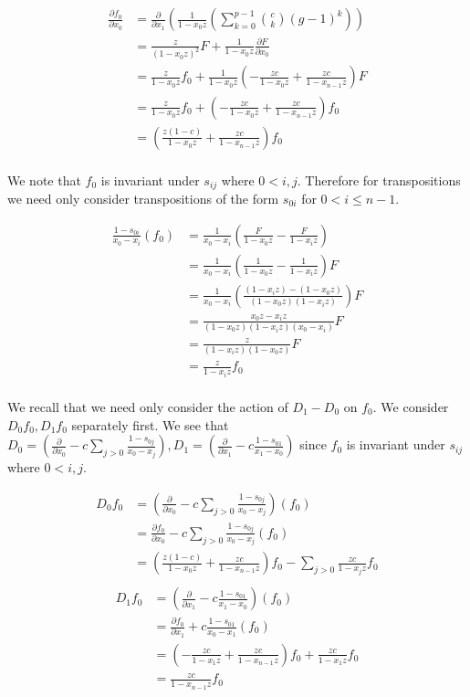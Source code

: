 \documentclass{article}
\numberwithin{equation}{section}
\begin{document}
\begin{align*}
\frac{\partial f_0}{\partial x_0}&=\frac{\partial}{\partial x_1}\left(\frac{1}{1-x_0z}\left(\sum_{k=0}^{p-1} \binom{c}{k} (g-1)^k\right)\right)\\
&=\frac{z}{(1-x_0z)^2}F+\frac{1}{1-x_0z}\frac{\partial F}{\partial x_0}\\
&=\frac{z}{1-x_0z}f_0+\frac{1}{1-x_0z}\left(-\frac{zc}{1-x_0z}+\frac{zc}{1-x_{n-1}z}\right)F\\
&=\frac{z}{1-x_0z}f_0+\left(-\frac{zc}{1-x_0z}+\frac{zc}{1-x_{n-1}z}\right)f_0\\
&=\left(\frac{z(1-c)}{1-x_0z}+\frac{zc}{1-x_{n-1}z}\right)f_0\\
\end{align*}

We note that $f_0$ is invariant under $s_{ij}$ where $0 < i,j$. Therefore for transpositions we need only consider transpositions of the form $s_{0i}$ for $0 < i \le n-1$. 

\begin{align*}
\frac{1-s_{0i}}{x_0-x_i}(f_0)&=\frac{1}{x_0-x_i}\left(\frac{F}{1-x_0z}-\frac{F}{1-x_iz}\right)\\
&=\frac{1}{x_0-x_i}\left(\frac{1}{1-x_0z}-\frac{1}{1-x_iz}\right)F\\
&=\frac{1}{x_0-x_i}\left(\frac{(1-x_iz)-(1-x_0z)}{(1-x_0z)(1-x_iz)}\right)F\\
&=\frac{x_0z-x_iz}{(1-x_0z)(1-x_iz)(x_0-x_i)}F\\
&=\frac{z}{(1-x_iz)(1-x_0z)}F\\
&=\frac{z}{1-x_iz}f_0\\
\end{align*}


We recall that we need only consider the action of $D_1-D_0$ on $f_0$. We consider $D_0f_0, D_1f_0$ separately first. We see that $D_0=\left(\frac{\partial}{\partial x_0}-c\sum_{j > 0} \frac{1-s_{0j}}{x_0-x_j}\right), D_1=\left(\frac{\partial}{\partial x_1}-c \frac{1-s_{01}}{x_1-x_0}\right)$ since $f_0$ is invariant under $s_{ij}$ where $0 < i,j$. 

\begin{align*}
D_0f_0&=\left(\frac{\partial}{\partial x_0}-c\sum_{j > 0} \frac{1-s_{0j}}{x_0-x_j}\right)(f_0)\\
&=\frac{\partial f_0}{\partial x_0}-c\sum_{j > 0} \frac{1-s_{0j}}{x_0-x_j}(f_0)\\
&=\left(\frac{z(1-c)}{1-x_0z}+\frac{zc}{1-x_{n-1}z}\right)f_0-\sum_{j > 0} \frac{zc}{1-x_jz}f_0\\
\end{align*}
\begin{align*}
D_1f_0&=\left(\frac{\partial}{\partial x_1}-c \frac{1-s_{01}}{x_1-x_0}\right)(f_0)\\
&=\frac{\partial f_0}{\partial x_1}+c \frac{1-s_{01}}{x_0-x_1}(f_0)\\
&=\left(-\frac{zc}{1-x_1z}+\frac{zc}{1-x_{n-1}z}\right)f_0+\frac{zc}{1-x_1z}f_0\\
&=\frac{zc}{1-x_{n-1}z}f_0\\
\end{align*}
\end{document}
